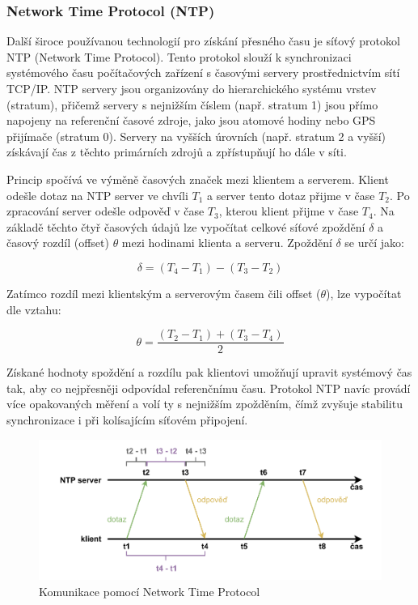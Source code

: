 \subsubsection{Network Time Protocol (NTP)}
Další široce používanou technologií pro získání přesného času je síťový protokol NTP (Network Time Protocol). Tento protokol slouží k synchronizaci systémového času počítačových zařízení s časovými servery prostřednictvím sítí TCP/IP. NTP servery jsou organizovány do hierarchického systému vrstev (stratum), přičemž servery s nejnižším číslem (např. stratum 1) jsou přímo napojeny na referenční časové zdroje, jako jsou atomové hodiny nebo GPS přijímače (stratum 0). Servery na vyšších úrovních (např. stratum 2 a vyšší) získávají čas z těchto primárních zdrojů a zpřístupňují ho dále v síti.

Princip spočívá ve výměně časových značek mezi klientem a serverem. Klient odešle dotaz na NTP server ve chvíli $T_1$ a server tento dotaz přijme v čase $T_2$. Po zpracování server odešle odpověď v čase $T_3$, kterou klient přijme v čase $T_4$. Na základě těchto čtyř časových údajů lze vypočítat celkové síťové zpoždění $\delta$ a časový rozdíl (offset) $\theta$ mezi hodinami klienta a serveru. Zpoždění $\delta$ se určí jako:

\begin{equation}
    \delta = (T_4 - T_1) - (T_3 - T_2)
    \label{eq:ntp_delay}
\end{equation}
    

Zatímco rozdíl mezi klientským a serverovým časem čili offset ($\theta$), lze vypočítat dle vztahu:

\begin{equation}
    \theta = \frac{(T_2 - T_1) + (T_3 - T_4)}{2}
    \label{eq:ntp_offset}
\end{equation}

Získané hodnoty spoždění a rozdílu pak klientovi umožňují upravit systémový čas tak, aby co nejpřesněji odpovídal referenčnímu času. Protokol NTP navíc provádí více opakovaných měření a volí ty s nejnižším zpožděním, čímž zvyšuje stabilitu synchronizace i při kolísajícím síťovém připojení. \cite{sookocheff_ntp}

\begin{figure}[h]
    \centering
    \includegraphics[width=1.00\textwidth]{obrazky-figures/network_time_protocol.pdf}
    
    \caption{Komunikace pomocí Network Time Protocol \cite{sookocheff_ntp}}
    \label{fig:network-time-protocol}
\end{figure}

